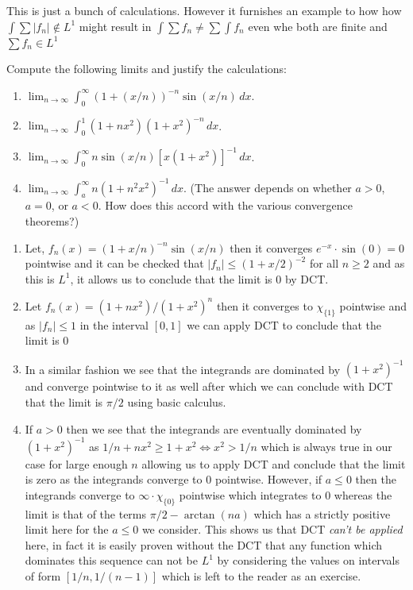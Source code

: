 \documentclass[12pt,a4paper]{article}
\begin{document}
\begin{solution}
    This is just a bunch of calculations. However it furnishes an example to how how $\int\sum|f_n|\notin L^1$ might result in $\int\sum f_n\neq\sum\int f_n$ even whe both are finite and $\sum f_n\in L^1$
\end{solution}

\begin{problem}\label{prob:2-28}
Compute the following limits and justify the calculations:
\begin{enumerate}[label=\alph*.]
    \item $\lim_{n \to \infty} \int_0^\infty (1 + (x/n))^{-n} \sin(x/n) \, dx$.
    \item $\lim_{n \to \infty} \int_0^1 (1 + nx^2)(1 + x^2)^{-n} \, dx$.
    \item $\lim_{n \to \infty} \int_0^\infty n \sin(x/n) [x(1 + x^2)]^{-1} \, dx$.
    \item $\lim_{n \to \infty} \int_a^\infty n(1 + n^2x^2)^{-1} \, dx$. (The answer depends on whether $a > 0$, $a = 0$, or $a < 0$. How does this accord with the various convergence theorems?)
\end{enumerate}
\end{problem}
\begin{solution}
    \begin{enumerate}[label=\alph*.]
		\item Let, $f_n(x)=(1+x/n)^{-n}\sin(x/n)$ then it converges $e^{-x}\cdot\sin(0)=0$ pointwise and it can be checked that $|f_n|\leq (1+x/2)^{-2}$ for all $n\geq 2$ and as this is $L^1$, it allows us to conclude that the limit is $0$ by DCT.
		\item Let $f_n(x)=(1+nx^2)/(1+x^2)^n$ then it converges to $\chi_{\{1\}}$ pointwise and as $|f_n|\leq 1$ in the interval $[0,1]$ we can apply DCT to conclude that the limit is $0$
		\item In a similar fashion we see that the integrands are dominated by $(1+x^2)^{-1}$ and converge pointwise to it as well after which we can conclude with DCT that the limit is $\pi/2$ using basic calculus.
		\item If $a>0$ then we see that the integrands are eventually dominated by $(1+x^2)^{-1}$ as $1/n+nx^2\geq 1+x^2\iff x^2>1/n$ which is always true in our case for large enough $n$ allowing us to apply DCT and conclude that the limit is zero as the integrands converge to $0$ pointwise. However, if $a\leq 0$ then the integrands converge to $\infty\cdot\chi_{\{0\}}$ pointwise which integrates to $0$ whereas the limit is that of the terms $\pi/2-\arctan(na)$ which has a strictly positive limit here for the $a\leq 0$ we consider. This shows us that DCT \textit{can't be applied} here, in fact it is easily proven without the DCT that any function which dominates this sequence can not be $L^1$ by considering the values on intervals of form $[1/n,1/(n-1)]$ which is left to the reader as an exercise.
    \end{enumerate}
\end{solution}
\end{document}
